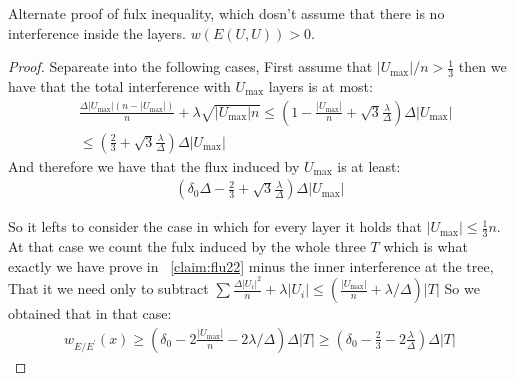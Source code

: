   \begin{claim}  Alternate proof of fulx inequality, which dosn't assume that there is no interference inside the layers. $w\left( E\left( U,U \right) \right) > 0 $. 
  \end{claim}
  \newcommand{\mxU}{U_{\text{max}}}
  \begin{proof}
    Separeate into the following cases, First assume that $ |\mxU| / n   > \frac{1}{3}  $ then we have that the total interference with $\mxU$ layers is at most: 
    \begin{equation*}
      \begin{split}
	& \frac{\Delta|\mxU|\left( n- |\mxU| \right)}{n} + \lambda\sqrt{|\mxU| n } \le \left( 1 - \frac{|\mxU|}{n} + \sqrt{3} \frac{\lambda}{\Delta}  \right) \Delta |\mxU |  \\ 
	& \le \left( \frac{2}{3} + \sqrt{3} \frac{\lambda}{\Delta}  \right) \Delta |\mxU |  
      \end{split}
    \end{equation*}
    And therefore we have that the flux induced by $\mxU$ is at least: 
    \begin{equation*}
      \begin{split}
	\left( \delta_{0}\Delta -  \frac{2}{3} + \sqrt{3} \frac{\lambda}{\Delta}  \right)\Delta|\mxU|
      \end{split}
    \end{equation*}
   
    So it lefts to consider the case in which for every layer it holds that $|\mxU| \le \frac{1}{3}n$. At that case we count the fulx induced by the whole three $T$ which is what exactly we have prove in ~\cref{claim:flu22} minus the inner interference at the tree, That it we need only to subtract $ \sum{ \frac{\Delta|U_{i}|^{2}}{n} + \lambda|U_{i}| } \le \left(\frac{|\mxU|}{n} + \lambda/\Delta  \right)  |T| $ So we obtained that in that case: 
    \begin{equation*}
      \begin{split}
	w_{E/E^{\prime}}\left( x \right)\ge\left( \delta_{0} - 2 \frac{|\mxU| }{n} - 2\lambda/\Delta \right) \Delta |T| \ge \left( \delta_{0} - \frac{2}{3} - 2 \frac{\lambda}{\Delta}    \right)\Delta |T|
      \end{split}
    \end{equation*}
  \end{proof}

